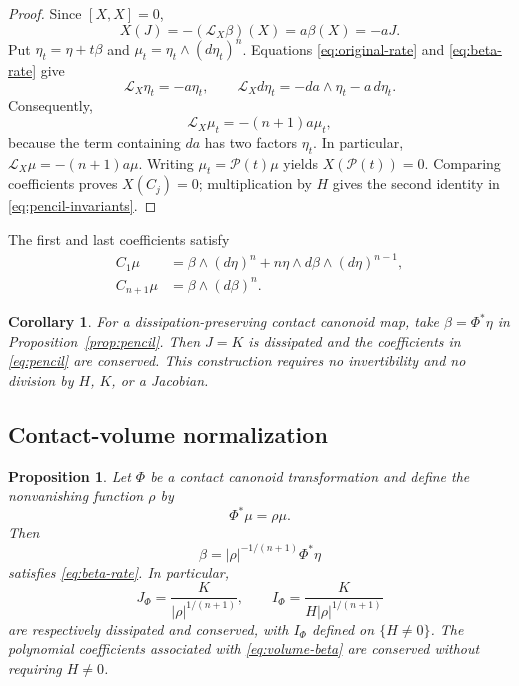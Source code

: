 \documentclass[11pt,a4paper]{article}
\numberwithin{equation}{section}
\newtheorem{proposition}{Proposition}
\newtheorem{corollary}{Corollary}
\theoremstyle{definition}
\theoremstyle{remark}
\begin{document}
\begin{proof}
Since $[X,X]=0$,
\[
X(J)=-(\mathcal L_X\beta)(X)=a\beta(X)=-aJ.
\]
Put $\eta_t=\eta+t\beta$ and $\mu_t=\eta_t\wedge(d\eta_t)^n$.
Equations \eqref{eq:original-rate} and \eqref{eq:beta-rate} give
\[
\mathcal L_X\eta_t=-a\eta_t,\qquad
\mathcal L_Xd\eta_t=-da\wedge\eta_t-a\,d\eta_t.
\]
Consequently,
\[
\mathcal L_X\mu_t=-(n+1)a\mu_t,
\]
because the term containing $da$ has two factors $\eta_t$.
In particular, $\mathcal L_X\mu=-(n+1)a\mu$.
Writing $\mu_t=\mathcal P(t)\mu$ yields $X(\mathcal P(t))=0$.
Comparing coefficients proves $X(C_j)=0$; multiplication
by $H$ gives the second identity in
\eqref{eq:pencil-invariants}.
\end{proof}

The first and last coefficients satisfy
\begin{align}
C_1\mu
&=\beta\wedge(d\eta)^n
+n\eta\wedge d\beta\wedge(d\eta)^{n-1},\\
C_{n+1}\mu&=\beta\wedge(d\beta)^n.
\label{eq:last-coefficient}
\end{align}

\begin{corollary}
\label{cor:equal-rates}
For a dissipation-preserving contact canonoid map,
take $\beta=\Phi^*\eta$ in Proposition~\ref{prop:pencil}.
Then $J=K$ is dissipated and the coefficients in
\eqref{eq:pencil} are conserved. This construction requires
no invertibility and no division by $H$, $K$, or a Jacobian.
\end{corollary}



\subsection{Contact-volume normalization}

\begin{proposition}
\label{prop:volume}
Let $\Phi$ be a contact canonoid transformation and define
the nonvanishing function $\rho$ by
\begin{equation}
\Phi^*\mu=\rho\mu.
\label{eq:rho}
\end{equation}
Then
\begin{equation}
\beta=|\rho|^{-1/(n+1)}\Phi^*\eta
\label{eq:volume-beta}
\end{equation}
satisfies \eqref{eq:beta-rate}. In particular,
\begin{equation}
J_\Phi=\frac{K}{|\rho|^{1/(n+1)}},
\qquad
I_\Phi=\frac{K}{H|\rho|^{1/(n+1)}}
\label{eq:volume-invariants}
\end{equation}
are respectively dissipated and conserved, with $I_\Phi$
defined on $\{H\neq0\}$. The polynomial coefficients
associated with \eqref{eq:volume-beta} are conserved
without requiring $H\neq0$.
\end{proposition}
\end{document}
